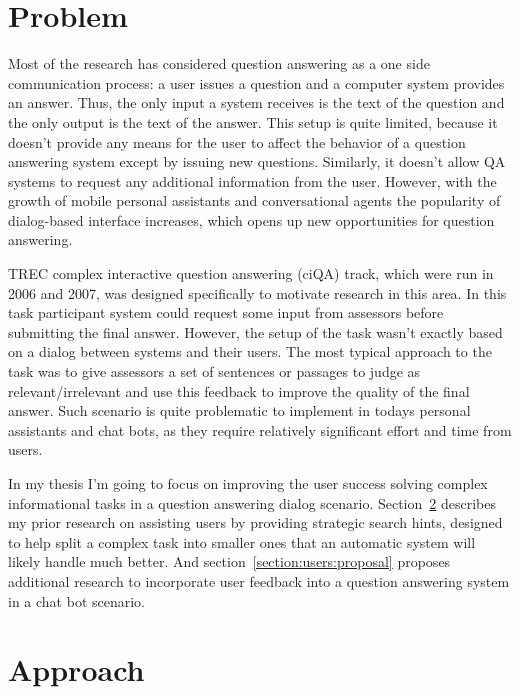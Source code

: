 %

\label{chapter:users}

\noindent

\section{Problem}
\label{section:users:problem}

Most of the research has considered question answering as a one side communication process: a user issues a question and a computer system provides an answer.
Thus, the only input a system receives is the text of the question and the only output is the text of the answer.
This setup is quite limited, because it doesn't provide any means for the user to affect the behavior of a question answering system except by issuing new questions.
Similarly, it doesn't allow QA systems to request any additional information from the user.
However, with the growth of mobile personal assistants and conversational agents the popularity of dialog-based interface increases, which opens up new opportunities for question answering.

TREC complex interactive question answering (ciQA) track, which were run in 2006 and 2007, was designed specifically to motivate research in this area.
In this task participant system could request some input from assessors before submitting the final answer.
However, the setup of the task wasn't exactly based on a dialog between systems and their users.
The most typical approach to the task was to give assessors a set of sentences or passages to judge as relevant/irrelevant and use this feedback to improve the quality of the final answer.
Such scenario is quite problematic to implement in todays personal assistants and chat bots, as they require relatively significant effort and time from users.

In my thesis I'm going to focus on improving the user success solving complex informational tasks in a question answering dialog scenario.
Section~\ref{section:users:approach} describes my prior research on assisting users by providing strategic search hints, designed to help split a complex task into smaller ones that an automatic system will likely handle much better.
And section~\ref{section:users:proposal} proposes additional research to incorporate user feedback into a question answering system in a chat bot scenario.

\section{Approach}
\label{section:users:approach}

